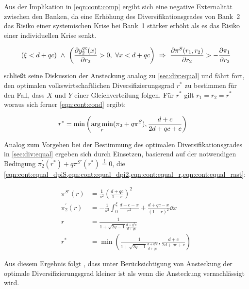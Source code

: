 Aus der Implikation in \cref{eqn:cont:comp} ergibt sich eine negative Externalität zwischen den Banken, da eine Erhöhung des Diversifikationsgrades von Bank~2 das Risiko einer systemischen Krise bei Bank~1 stärker erhöht als es das Risiko einer individuellen Krise senkt.

\begin{align}
	(\xi < d+qc) \ \wedge \ \left(\pdv{y_2^{qc}(x)}{r_2} > 0, \ \forall x < d+qc\right) \ \Rightarrow \ \pdv{\pi^{S}(r_1,r_2)}{r_2} > -\pdv{\pi_1}{r_2} \label{eqn:cont:comp}
\end{align}

 schließt seine Diskussion der Ansteckung analog zu \cref{sec:div:equal} und fährt fort, den optimalen volkswirtschaftlichen Diversifizierungsgrad $r^\ast$ zu bestimmen für den Fall, dass $X$ und $Y$ einer Gleichverteilung folgen. Für $r^\ast$ gilt $r_1 = r_2 =r^\ast$ woraus sich ferner \cref{eqn:cont:cond} ergibt:

\begin{align}
	r^\ast & = \min \left( \operatorname*{arg\,min}_r(\pi_2+q\pi^S),\frac{d+c}{2d+qc+c}  \right) \label{eqn:cont:cond}
\end{align}

Analog zum Vorgehen bei der Bestimmung des optimalen Diversifikationsgrades in \cref{sec:div:equal} ergeben sich durch Einsetzen, basierend auf der notwendigen Bedingung $\pi_2^{\prime}(r^\ast) + q\pi^{S\prime}(r^\ast) \overset{!}{=} 0$, die \cref{eqn:cont:equal_dpiS,eqn:cont:equal_dpi2,eqn:cont:equal_r,eqn:cont:equal_rast}:

\begin{align}
	\pi^{S\prime}(r)  & = \frac{1}{s^2} \left( \frac{d+qc}{1-r} \right)^2                                      \label{eqn:cont:equal_dpiS} \\
	\pi_2^{\prime}(r) & = -\frac{1}{s^2} \int_{0}^{\xi} \frac{d+c-x}{r^2} + \frac{d +qc -x}{(1-r)^2} \dd x     \label{eqn:cont:equal_dpi2} \\
	r                 & = \frac{1}{1+\sqrt{2q-1}\frac{d+q^2c}{d+qc}}                                           \label{eqn:cont:equal_r}    \\
	r^\ast            & = \min \left( \frac{1}{1+\sqrt{2q-1}\frac{d+q^2c}{d+qc}} , \frac{d+c}{2d+qc+c} \right) \label{eqn:cont:equal_rast}
\end{align}

Aus diesem Ergebnis folgt \citeauthor{Wagner-2010}, dass unter Berücksichtigung von Ansteckung der optimale Diversifizierungsgrad kleiner ist als wenn die Ansteckung vernachlässigt wird.

